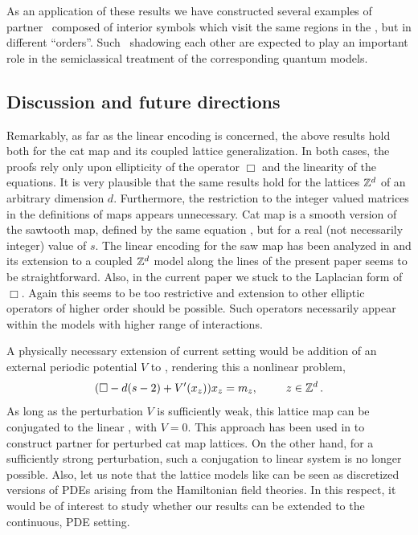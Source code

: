 \documentclass[12pt]{iopart}
\begin{document}
As an application of these results we have constructed several examples
of partner \twots\ composed of interior symbols which visit the same
regions in the \statesp, but in different {\spt} ``orders''. Such
\twots\ shadowing each other are expected to play an important role in
the semiclassical treatment of the corresponding quantum models.

\subsection{Discussion and future directions}

Remarkably, as far as the linear encoding is concerned, the above results
hold both for the {cat map} and its coupled lattice generalization. In
both cases, the  proofs rely only upon ellipticity of the operator $\Box$
and the linearity of the equations. It is very plausible  that the same
results hold for the lattices $\mathbb{Z}^d$  of an arbitrary dimension $d$.
Furthermore, the restriction to
the integer valued matrices in the definitions of maps appears unnecessary. Cat
map is a smooth version of the sawtooth map, defined by the
same equation , but for a real (not necessarily integer) value
of $s$. The linear encoding for the {saw map} has been analyzed in
 and its extension  to a coupled $\mathbb{Z}^d$ model along the
lines of the present paper seems to be straightforward. Also,  in the current
paper we stuck to  the Laplacian  form of $\Box$.   Again this seems to be
too restrictive and extension to other elliptic  operators of higher order
should be possible. Such operators necessarily appear within the models
with higher range of interactions.

A physically necessary extension of  current setting would be addition of an
external periodic potential ${V}$ to , rendering this a
nonlinear problem,
 \begin{equation}
 (\Box -d(s-2)+ {V}'(x_z)) x_z = {m_{z}}, \hspace*{25pt} z\in \mathbb{Z}^{d}
 \,. \label{LinearConnPerturbed}
\end{equation}
As long as the perturbation ${V}$ is sufficiently weak, this lattice map can
be conjugated to the linear {\catlatt}, with ${V}=0$.
This approach has been used in  to construct partner
{\twots} for perturbed cat map lattices.
On the other hand, for a sufficiently strong perturbation, such a conjugation
to linear system is no longer possible. Also, let us note that the lattice
models like   can be seen  as discretized versions
of PDEs arising from the Hamiltonian field theories.
In this respect, it would be of  interest  to study whether our results  can
be extended to the continuous, PDE setting.
\end{document}
